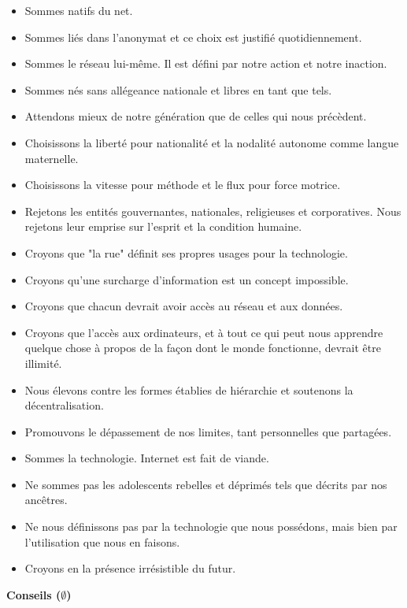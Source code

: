 \documentclass[11pt,twoside,a4paper]{book}
\begin{document}
\begin{multicols*}{2}
\begin{itemize}
		\item Sommes natifs du net.
		\item Sommes li{\'e}s dans l'anonymat et ce choix est justifi{\'e} quotidiennement.
		\item Sommes le r{\'e}seau lui-m{\^e}me. Il est d{\'e}fini par notre action et notre inaction.
		\item Sommes n{\'e}s sans all{\'e}geance nationale et libres en tant que tels.
		\item Attendons mieux de notre g{\'e}n{\'e}ration que de celles qui nous pr{\'e}c{\`e}dent.
		\item Choisissons la libert{\'e} pour nationalit{\'e} et la nodalit{\'e} autonome comme langue maternelle.
		\item Choisissons la vitesse pour m{\'e}thode et le flux pour force motrice.
		\item Rejetons les entit{\'e}s gouvernantes, nationales, religieuses et corporatives. Nous rejetons leur emprise sur l'esprit et la condition humaine.
		\item Croyons que "la rue" d{\'e}finit ses propres usages pour la technologie.
		\item Croyons qu'une surcharge d'information est un concept impossible.
		\item Croyons que chacun devrait avoir acc{\`e}s au r{\'e}seau et aux donn{\'e}es.
		\item Croyons que l'acc{\`e}s aux ordinateurs, et {\`a} tout ce qui peut nous apprendre quelque chose {\`a} propos de la fa\c{c}on dont le monde fonctionne, devrait {\^e}tre illimit{\'e}.
		\item Nous {\'e}levons contre les formes {\'e}tablies de hi{\'e}rarchie et soutenons la d{\'e}centralisation.
		\item Promouvons le d{\'e}passement de nos limites, tant personnelles que partag{\'e}es.
		\item Sommes la technologie. Internet est fait de viande.
		\item Ne sommes pas les adolescents rebelles et d{\'e}prim{\'e}s tels que d{\'e}crits par nos anc{\^e}tres.
		\item Ne nous d{\'e}finissons pas par la technologie que nous poss{\'e}dons, mais bien par l'utilisation que nous en faisons.
		\item Croyons en la pr{\'e}sence irr{\'e}sistible du futur.
	\end{itemize} %
	
	\textbf{Conseils ($\emptyset$)}
	\begin{itemize}
		\setlength{\itemsep}{1pt}
		\setlength{\parskip}{0pt}
		\setlength{\parsep}{0pt}
		

\end{itemize}
\end{multicols*}
\end{document}
